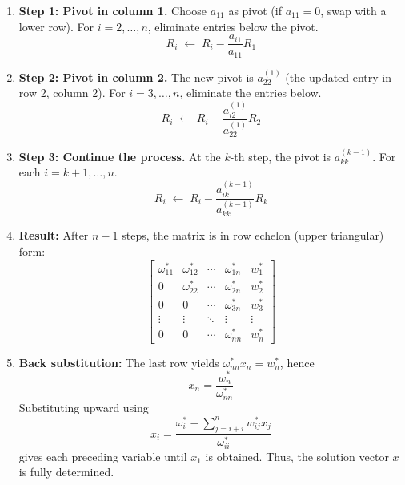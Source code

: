 \documentclass[../../../main.tex]{subfiles}
\begin{document}
\begin{enumerate}
    \item \textbf{Step 1: Pivot in column 1.}
          Choose $a_{11}$ as pivot (if $a_{11}=0$, swap with a lower row).
          For $i=2,\dots,n$, eliminate entries below the pivot.
          \begin{equation*}
              R_i \;\leftarrow\; R_i - \frac{a_{i1}}{a_{11}} R_1
          \end{equation*}
    \item \textbf{Step 2: Pivot in column 2.}
          The new pivot is $a_{22}^{(1)}$ (the updated entry in row 2, column 2).
          For $i=3,\dots,n$, eliminate the entries below.
          \begin{equation*}
              R_i \;\leftarrow\; R_i - \frac{a_{i2}^{(1)}}{a_{22}^{(1)}} R_2
          \end{equation*}
    \item \textbf{Step 3: Continue the process.}  At the $k$-th step, the pivot is $a_{kk}^{(k-1)}$.
          For each $i = k+1, \dots, n$.
          \begin{equation*}
              R_i \;\leftarrow\; R_i - \frac{a_{ik}^{(k-1)}}{a_{kk}^{(k-1)}} R_k
          \end{equation*}
    \item \textbf{Result:}
          After $n-1$ steps, the matrix is in row echelon (upper triangular) form:
          \[
              \begin{bmatrix}
                  \omega_{11}^{*} & \omega_{12}^{*} & \cdots & \omega_{1n}^{*} & w_1^{*} \\
                  0               & \omega_{22}^{*} & \cdots & \omega_{2n}^{*} & w_2^{*} \\
                  0               & 0               & \cdots & \omega_{3n}^{*} & w_3^{*} \\
                  \vdots          & \vdots          & \ddots & \vdots          & \vdots  \\
                  0               & 0               & \cdots & \omega_{nn}^{*} & w_n^{*}
              \end{bmatrix}
          \]

    \item \textbf{Back substitution:}
          The last row yields $\omega_{nn}^{*} x_n = w_n^{*}$, hence
          \[
              x_n = \frac{w_n^{*}}{\omega_{nn}^{*}}
          \]
          Substituting upward using
          \begin{equation*}
              x_i =\frac{\omega_i ^* -\sum_{j=i+i }^{n }w_{ij}^*x_j}{\omega_{ii }^*}
          \end{equation*}
          gives each preceding variable until $x_1$ is obtained.
          Thus, the solution vector $x$ is fully determined.
\end{enumerate}
\end{document}
